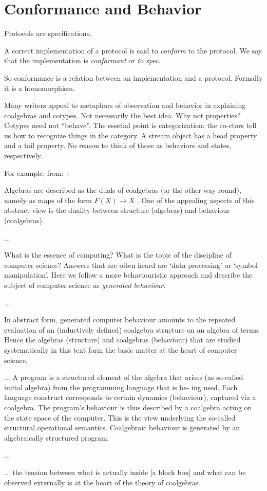 \chapter{Conformance and Behavior}

Protocols are specifications.

A correct implementation of a protocol is said to \textit{conform} to
the protocol. We say that the implementation is \textit{conformant} or
\textit{to spec}.

So conformance is a relation between an implementation and a protocol.
Formally it is a homomorphism.

Many writers appeal to metaphors of observation and behavior in
explaining coalgebras and cotypes. Not necessarily the best idea. Why
not properties? Cotypes need not ``behave''. The essetial point is
categorization: the co-ctors tell us how to recognize things in the
category. A stream object has a head property and a tail property. No
reason to think of those as behaviors and states, respectively.

For example, from: \cite{jacobs_intro_coalgebra}:

\begin{displayquote}[p. iv-v]
  Algebras are described as the duals of coalgebras (or the other
  way round), namely as maps of the form \(F (X) → X\) . One of the
  appealing aspects of this abstract view is the duality between
  structure (algebras) and behaviour (coalgebras).

  ...

  What is the essence of computing? What is the topic of the
  discipline of computer science? Answers that are often heard are
  ‘data processing’ or ‘symbol manipulation’. Here we follow a more
  behaviouristic approach and describe the subject of computer science
  as \textit{generated behaviour}.

  ...

  In abstract form, generated computer behaviour amounts to the repeated evaluation of an (inductively defined) coalgebra structure on an algebra of terms. Hence the algebras (structure) and coalgebras (behaviour) that are studied systematically in this text form the basic matter at the heart of computer science.

  ...
  A program is a structured element of the algebra that arises (as so-called initial algebra) from the programming language that is be- ing used. Each language construct corresponds to certain dynamics (behaviour), captured via a coalgebra. The program’s behaviour is thus described by a coalgebra acting on the state space of the computer. This is the view underlying the so-called structural operational semantics. Coalgebraic behaviour is generated by an algebraically structured program.

  ...

  ... the tension between what is actually inside [a block box] and
  what can be observed externally is at the heart of the theory of
  coalgebras.
\end{displayquote}


